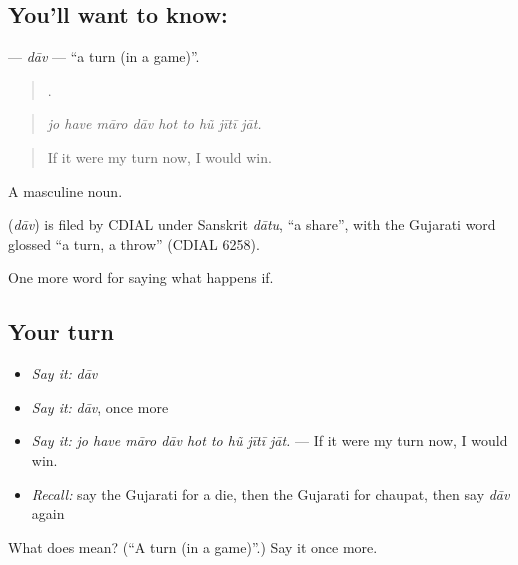 \subsection*{You'll want to know: }
\textbf{} — \emph{dāv} — \textquotedblleft{}a turn (in a game)\textquotedblright{}.

\begin{quote}
        .
\end{quote}

\begin{quote}
\emph{jo have māro dāv hot to hũ jītī jāt.}
\end{quote}

\begin{quote}
If it were my turn now, I would win.
\end{quote}

A masculine noun.

\begin{cousinweb}
\textbf{} (\emph{dāv}) is filed by CDIAL under Sanskrit \emph{dātu}, \textquotedblleft{}a share\textquotedblright{}, with the Gujarati word glossed \textquotedblleft{}a turn, a throw\textquotedblright{} (CDIAL 6258).
\end{cousinweb}

\begin{grammarlens}[title={What you've built}]
One more word for saying what happens if.
\end{grammarlens}

\subsection*{Your turn}
\begin{itemize}
\raggedright
  \item \emph{Say it:} \emph{dāv}
  \item \emph{Say it:} \emph{dāv}, once more
  \item \emph{Say it:} \emph{jo have māro dāv hot to hũ jītī jāt.} — If it were my turn now, I would win.
  \item \emph{Recall:} say the Gujarati for a die, then the Gujarati for chaupat, then say \emph{dāv} again
\end{itemize}

\begin{tcolorbox}[breakable,colback=teal!4,colframe=teal!35!black,title={Before you move on}]
What does  mean? (\textquotedblleft{}A turn (in a game)\textquotedblright{}.) Say it once more.
\end{tcolorbox}
